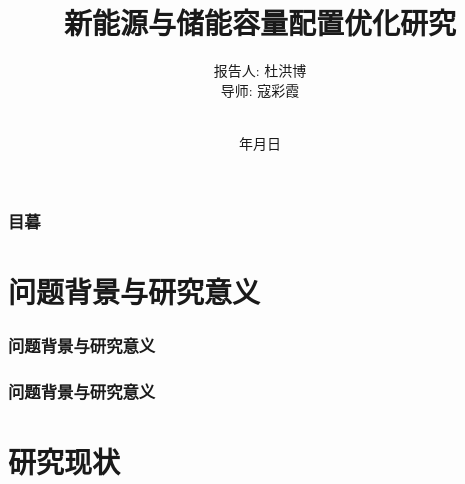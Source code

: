 \documentclass{beamer}
\renewcommand{\today}{\number\year 年\number\month 月\number\day 日}
\begin{document}
\title[新能源与储能容量配置优化研究]%
{新能源与储能容量配置优化研究}

\author[杜洪博]%
{报告人: 杜洪博\\
导\quad 师: 寇彩霞\rule[0pt]{0pt}{20pt}\\}

\institute[BUPT]{\textcolor[rgb]{0.0,0.0,0.10}%
{\small\ttfamily 北京邮电大学\ 理学院\\[10pt]}}

\date{\today}

\begin{frame}[plain]
	\titlepage
\end{frame}

\begin{frame}
	\frametitle{目暮}
	\tableofcontents[hideallsubsections] %
\end{frame}

\AtBeginSection[] %
{ \begin{frame}<beamer> %
		\tableofcontents[currentsection,hideallsubsections]%
	\end{frame}
}





\section{问题背景与研究意义}

\begin{frame}
	\frametitle{问题背景与研究意义} 
	
\end{frame}

\begin{frame}
	\frametitle{问题背景与研究意义} 

\end{frame}

\section{研究现状}
\end{document}
